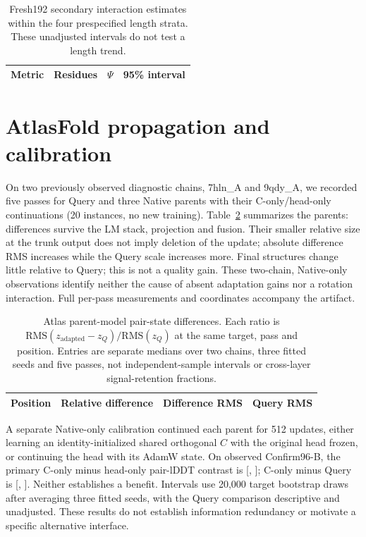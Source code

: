 \begin{table}[!htbp]\centering\footnotesize
\caption{Fresh192 secondary interaction estimates within the four prespecified
length strata. These unadjusted intervals do not test a length trend.}
\label{tab:fresh192_strata}
\begin{tabular}{llll}\toprule
Metric & Residues & $\Psi$ & 95\% interval \\\midrule

\end{tabular}\end{table}


\section{AtlasFold propagation and calibration}
\label{app:atlas_propagation}
On two previously observed diagnostic chains, 7hln\_A and 9qdy\_A, we recorded
five passes for Query and three Native parents with their C-only/head-only
continuations (20 instances, no new training). Table~\ref{tab:atlas_propagation}
summarizes the parents: differences survive the LM stack, projection and fusion.
Their smaller relative size at the trunk output does not imply deletion of the
update; absolute difference RMS increases while the Query scale increases more.
Final structures change little relative to Query; this is not a quality gain.
These two-chain, Native-only observations identify neither the cause of absent
adaptation gains nor a rotation interaction. Full per-pass measurements and
coordinates accompany the artifact.

\begin{table}[!htbp]\centering\small
\caption{Atlas parent-model pair-state differences. Each ratio is
$\mathrm{RMS}(z_{\mathrm{adapted}}-z_Q)/\mathrm{RMS}(z_Q)$ at the same
target, pass and position. Entries are separate medians over two chains,
three fitted seeds and five passes, not independent-sample intervals or
cross-layer signal-retention fractions.}
\label{tab:atlas_propagation}
\begin{tabular}{lrrr}\toprule
Position & Relative difference & Difference RMS & Query RMS \\\midrule

\end{tabular}\end{table}

A separate Native-only calibration continued each parent for 512
updates, either learning an identity-initialized shared orthogonal $C$ with
the original head frozen, or continuing the head with its AdamW state.
On observed Confirm96-B, the primary C-only minus head-only pair-lDDT contrast
is 
[, ];
C-only minus Query is 
[, ].
Neither establishes a benefit. Intervals use 20,000 target bootstrap draws
after averaging three fitted seeds, with the Query comparison descriptive and
unadjusted. These results do not establish information redundancy or motivate
a specific alternative interface.

